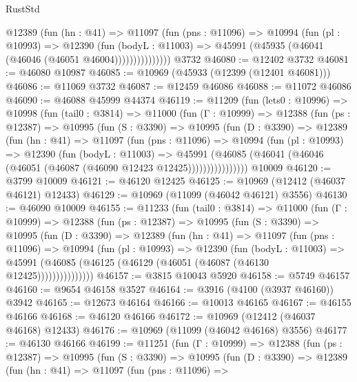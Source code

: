 \begin{lexlean}{RustStd}
\begin{coremodule}
                @12389
                  (fun (hn : @41) =>
                  @11097
                    (fun (pns : @11096) =>
                    @10994
                      (fun (pl : @10993) =>
                      @12390
                        (fun (bodyL : @11003) =>
                        @45991 (@45935 (@46041 (@46046 (@46051 @46004)))))))))))))))
    @3732
@46080 := @12402 @3732
@46081 := @46080 @10987
@46085 := @10969 (@45933 (@12399 (@12401 @46081)))
@46086 := @11069 @3732
@46087 := @12459 @46086
@46088 := @11072 @46086
@46090 := @46088 @45999 @44374
@46119 := @11209
    (fun (lets0 : @10996) =>
    @10998
      (fun (tail0 : @3814) =>
      @11000
        (fun (Γ : @10999) =>
        @12388
          (fun (ps : @12387) =>
          @10995
            (fun (S : @3390) =>
            @10995
              (fun (D : @3390) =>
              @12389
                (fun (hn : @41) =>
                @11097
                  (fun (pns : @11096) =>
                  @10994
                    (fun (pl : @10993) =>
                    @12390
                      (fun (bodyL : @11003) =>
                      @45991
                        (@46085
                          (@46041 (@46046 (@46051 (@46087 (@46090 @12423 @12425))))))))))))))))
    @10009
@46120 := @3799 @10009
@46121 := @46120 @12425
@46125 := @10969 (@12412 (@46037 @46121) @12433)
@46129 := @10969 (@11099 (@46042 @46121) @3556)
@46130 := @46090 @10009
@46155 := @11233
    (fun (tail0 : @3814) =>
    @11000
      (fun (Γ : @10999) =>
      @12388
        (fun (ps : @12387) =>
        @10995
          (fun (S : @3390) =>
          @10995
            (fun (D : @3390) =>
            @12389
              (fun (hn : @41) =>
              @11097
                (fun (pns : @11096) =>
                @10994
                  (fun (pl : @10993) =>
                  @12390
                    (fun (bodyL : @11003) =>
                    @45991 (@46085 (@46125 (@46129 (@46051 (@46087 (@46130 @12425)))))))))))))))
@46157 := @3815 @10043 @5920
@46158 := @5749 @46157
@46160 := @9654 @46158 @3527
@46164 := @3916 (@4100 (@3937 @46160)) @3942
@46165 := @12673 @46164
@46166 := @10013 @46165
@46167 := @46155 @46166
@46168 := @46120 @46166
@46172 := @10969 (@12412 (@46037 @46168) @12433)
@46176 := @10969 (@11099 (@46042 @46168) @3556)
@46177 := @46130 @46166
@46199 := @11251
    (fun (Γ : @10999) =>
    @12388
      (fun (ps : @12387) =>
      @10995
        (fun (S : @3390) =>
        @10995
          (fun (D : @3390) =>
          @12389
            (fun (hn : @41) =>
            @11097
              (fun (pns : @11096) =>

\end{coremodule}
\end{lexlean}
